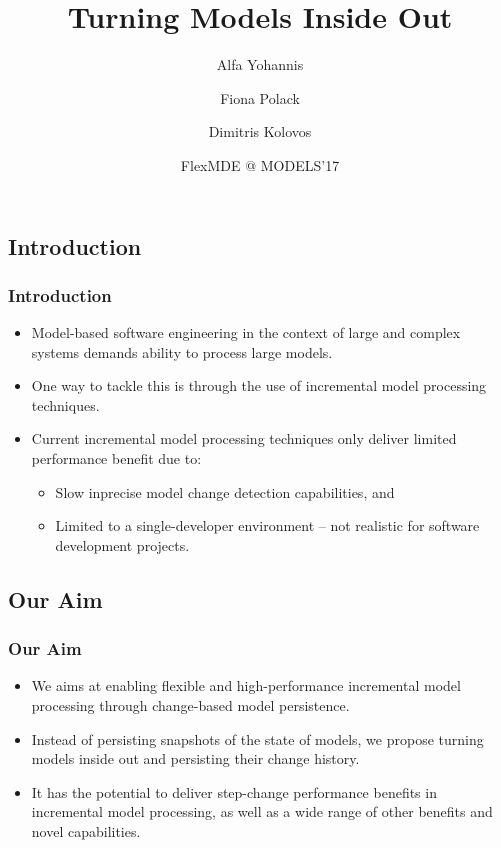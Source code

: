 \documentclass{beamer}
\begin{document}
    \title[Crisis] %
{Turning Models Inside Out}
\author[Author, Anders] %
{Alfa Yohannis\and Fiona Polack \and Dimitris Kolovos}
\date[18 September 2017]
{FlexMDE @ MODELS'17}
\subject{Computer Science}

\frame{\titlepage}

\begin{frame}
\section{Introduction}
\frametitle{Introduction}
\begin{itemize}
    \item Model-based software engineering in the context of large and complex systems demands ability to process large models.
    \item One way to tackle this is through the use of incremental model processing techniques.
    \item Current incremental model processing techniques only deliver limited performance benefit due to:
    \begin{itemize}
        \item Slow inprecise model change detection capabilities, and
        \item Limited to a single-developer environment -- not realistic for software development projects.
    \end{itemize}    
\end{itemize}
\end{frame}
  
\begin{frame}
\section{Our Aim}
\frametitle{Our Aim}
\begin{itemize}
\item We aims at enabling flexible and high-performance incremental model processing through change-based model persistence.
\item Instead of persisting snapshots of the state of models, we propose turning models inside out and persisting their change history.
\item It has the potential to deliver step-change performance benefits in incremental model processing, as well as a wide range of other benefits and novel capabilities.
\end{itemize}  
\end{frame}
\end{document}
